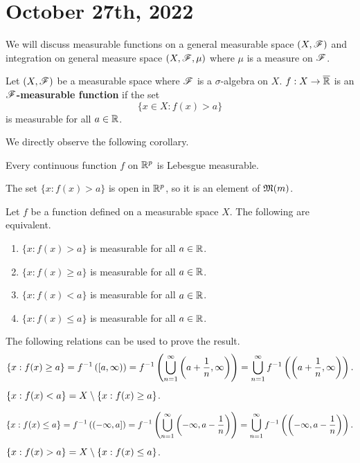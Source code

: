 \section*{October 27th, 2022}

We will discuss measurable functions on a general measurable space \((X, \mathscr{F})\) and integration on general measure space \((X, \mathscr{F}, \mu)\) where \(\mu\) is a measure on \(\mathscr{F}\).

  Let \((X, \mathscr{F})\) be a measurable space where \(\mathscr{F}\) is a \(\sigma\)-algebra on \(X\). \(f : X \rightarrow \overline{\mathbb{R}}\) is an \textbf{\(\mathscr{F}\)-measurable function} if the set
\[
    \{x \in X : f(x) > a\}
\]
is measurable for all \(a \in \mathbb{R}\).

We directly observe the following corollary.

\cor Every continuous function \(f\) on \(\mathbb{R}^p\) is Lebesgue measurable.

\pf The set \(\{x : f(x) > a\}\) is open in \(\mathbb{R}^p\), so it is an element of \(\mathfrak{M}(m)\).

 Let \(f\) be a function defined on a measurable space \(X\). The following are equivalent.
\begin{enumerate}
    \item \(\{x : f(x) > a\}\) is measurable for all \(a \in \mathbb{R}\).
    \item \(\{x : f(x) \geq a\}\) is measurable for all \(a \in \mathbb{R}\).
    \item \(\{x : f(x) < a\}\) is measurable for all \(a \in \mathbb{R}\).
    \item \(\{x : f(x) \leq a\}\) is measurable for all \(a \in \mathbb{R}\).
\end{enumerate}

\pf The following relations can be used to prove the result.\\
 \vspace*{-10px}
\begin{equation*}
    \{x : f(x) \geq a\} = f^{-1}\left( [a, \infty) \right) = f^{-1}\left( \bigcup_{n=1}^{\infty} \left( a + \frac{1}{n}, \infty \right) \right) = \bigcup_{n=1}^{\infty} f^{-1}\left( \left( a + \frac{1}{n}, \infty \right) \right).
\end{equation*}
 \(\{x : f(x) < a\} = X \setminus \{x : f(x) \geq a\}\).

 \vspace*{-10px}
\[
    \{x : f(x) \leq a\} = f^{-1} \left( (-\infty, a] \right) = f^{-1}\left( \bigcup_{n=1}^{\infty} \left( -\infty, a - \frac{1}{n} \right) \right) = \bigcup_{n=1}^{\infty} f^{-1}\left( \left( -\infty, a - \frac{1}{n} \right) \right).
\]
 \(\{x : f(x) > a\} = X \setminus \{x : f(x) \leq a\}\).

